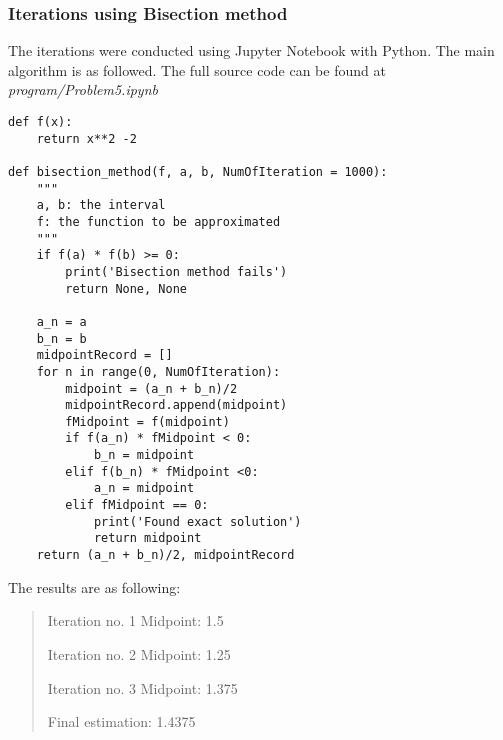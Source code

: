 \subsubsection{Iterations using Bisection method}
The iterations were conducted using Jupyter Notebook with Python. The main algorithm is as followed. The full source code can be found at \textit{program/Problem5.ipynb}
\begin{lstlisting}
def f(x):
    return x**2 -2 

def bisection_method(f, a, b, NumOfIteration = 1000):
    """
    a, b: the interval
    f: the function to be approximated
    """
    if f(a) * f(b) >= 0:
        print('Bisection method fails')
        return None, None
    
    a_n = a
    b_n = b
    midpointRecord = []
    for n in range(0, NumOfIteration):
        midpoint = (a_n + b_n)/2
        midpointRecord.append(midpoint)
        fMidpoint = f(midpoint)
        if f(a_n) * fMidpoint < 0:
            b_n = midpoint
        elif f(b_n) * fMidpoint <0:
            a_n = midpoint
        elif fMidpoint == 0:
            print('Found exact solution')
            return midpoint
    return (a_n + b_n)/2, midpointRecord
\end{lstlisting}

The results are as following:
\begin{quote}
Iteration no. 1
Midpoint:  1.5

Iteration no. 2
Midpoint:  1.25

Iteration no. 3
Midpoint:  1.375

Final estimation:  1.4375
\end{quote}
\newpage

